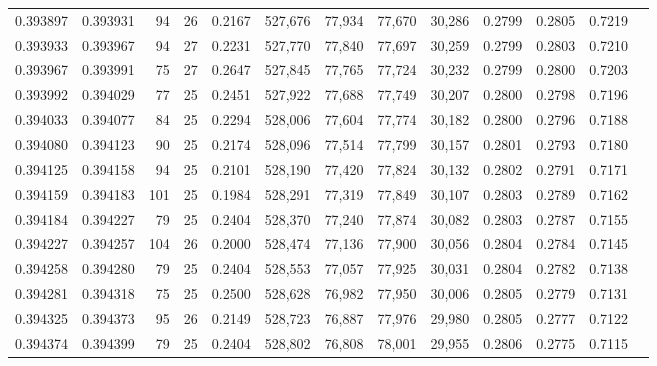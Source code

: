 \begin{tabular}{rrrrrrrrrrrrr}
0.393897 & 0.393931 &    94 &  26 &                                     0.2167 & 527,676 &  77,934 &  77,670 &  30,286 & 0.2799 & 0.2805 & 0.7219 \\
0.393933 & 0.393967 &    94 &  27 &                                     0.2231 & 527,770 &  77,840 &  77,697 &  30,259 & 0.2799 & 0.2803 & 0.7210 \\
0.393967 & 0.393991 &    75 &  27 &                                     0.2647 & 527,845 &  77,765 &  77,724 &  30,232 & 0.2799 & 0.2800 & 0.7203 \\
0.393992 & 0.394029 &    77 &  25 &                                     0.2451 & 527,922 &  77,688 &  77,749 &  30,207 & 0.2800 & 0.2798 & 0.7196 \\
0.394033 & 0.394077 &    84 &  25 &                                     0.2294 & 528,006 &  77,604 &  77,774 &  30,182 & 0.2800 & 0.2796 & 0.7188 \\
0.394080 & 0.394123 &    90 &  25 &                                     0.2174 & 528,096 &  77,514 &  77,799 &  30,157 & 0.2801 & 0.2793 & 0.7180 \\
0.394125 & 0.394158 &    94 &  25 &                                     0.2101 & 528,190 &  77,420 &  77,824 &  30,132 & 0.2802 & 0.2791 & 0.7171 \\
0.394159 & 0.394183 &   101 &  25 &                                     0.1984 & 528,291 &  77,319 &  77,849 &  30,107 & 0.2803 & 0.2789 & 0.7162 \\
0.394184 & 0.394227 &    79 &  25 &                                     0.2404 & 528,370 &  77,240 &  77,874 &  30,082 & 0.2803 & 0.2787 & 0.7155 \\
0.394227 & 0.394257 &   104 &  26 &                                     0.2000 & 528,474 &  77,136 &  77,900 &  30,056 & 0.2804 & 0.2784 & 0.7145 \\
0.394258 & 0.394280 &    79 &  25 &                                     0.2404 & 528,553 &  77,057 &  77,925 &  30,031 & 0.2804 & 0.2782 & 0.7138 \\
0.394281 & 0.394318 &    75 &  25 &                                     0.2500 & 528,628 &  76,982 &  77,950 &  30,006 & 0.2805 & 0.2779 & 0.7131 \\
0.394325 & 0.394373 &    95 &  26 &                                     0.2149 & 528,723 &  76,887 &  77,976 &  29,980 & 0.2805 & 0.2777 & 0.7122 \\
0.394374 & 0.394399 &    79 &  25 &                                     0.2404 & 528,802 &  76,808 &  78,001 &  29,955 & 0.2806 & 0.2775 & 0.7115 \\

\end{tabular}
